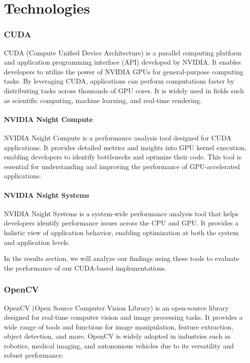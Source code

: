\chapter{Technologies}
\subsection{CUDA}

CUDA (Compute Unified Device Architecture) is a parallel computing platform and application programming interface (API) developed by NVIDIA. It enables developers to utilize the power of NVIDIA GPUs for general-purpose computing tasks. By leveraging CUDA, applications can perform computations faster by distributing tasks across thousands of GPU cores. It is widely used in fields such as scientific computing, machine learning, and real-time rendering.


\subsubsection{NVIDIA Nsight Compute}
NVIDIA Nsight Compute is a performance analysis tool designed for CUDA applications. It provides detailed metrics and insights into GPU kernel execution, enabling developers to identify bottlenecks and optimize their code. This tool is essential for understanding and improving the performance of GPU-accelerated applications.

\subsubsection{NVIDIA Nsight Systems}
NVIDIA Nsight Systems is a system-wide performance analysis tool that helps developers identify performance issues across the CPU and GPU. It provides a holistic view of application behavior, enabling optimization at both the system and application levels.

In the results section, we will analyze our findings using these tools to evaluate the performance of our CUDA-based implementations.

\subsection{OpenCV}

OpenCV (Open Source Computer Vision Library) is an open-source library designed for real-time computer vision and image processing tasks. It provides a wide range of tools and functions for image manipulation, feature extraction, object detection, and more. OpenCV is widely adopted in industries such as robotics, medical imaging, and autonomous vehicles due to its versatility and robust performance.

